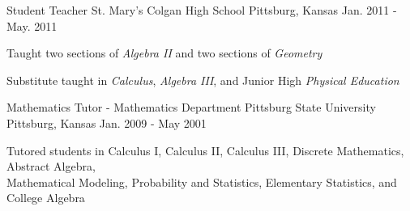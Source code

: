 \begin{cventries}
  \cventry
    {Student Teacher}
    {St. Mary's Colgan High School}
    {Pittsburg, Kansas}
    {Jan. 2011 - May. 2011}
    {
      \begin{cvitems}
        \item {Taught two sections of \textit{Algebra II} and two sections of \textit{Geometry}}
        \item {Substitute taught in \textit{Calculus}, \textit{Algebra III}, and Junior High \textit{Physical Education}}
      \end{cvitems}
    }
  \cventry
    {Mathematics Tutor - Mathematics Department}
    {Pittsburg State University}
    {Pittsburg, Kansas}
    {Jan. 2009 - May 2001}
    {
      \begin{cvitems}
        \item {Tutored students in Calculus I, Calculus II, Calculus III, Discrete Mathematics, Abstract Algebra, \\ Mathematical Modeling, Probability and Statistics, Elementary Statistics, and College Algebra}
      \end{cvitems}
    }
\end{cventries}
